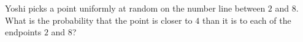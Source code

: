 Yoshi picks a point uniformly at random on the number line between $2$ and $8$. What is the probability that the point is closer to $4$ than it is to each of the endpoints $2$ and $8$?

